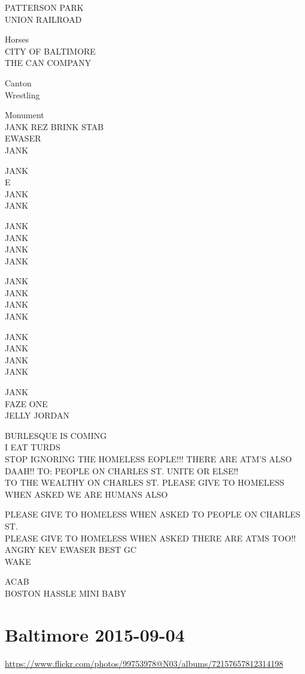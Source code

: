 \documentclass[10pt,letterpaper]{article}
\begin{document}
PATTERSON PARK\\
UNION RAILROAD

Horses\\
CITY OF BALTIMORE\\
THE CAN COMPANY

Canton\\
Wrestling

Monument\\
JANK REZ BRINK STAB\\
EWASER\\
JANK

JANK\\
E\\
JANK\\
JANK

JANK\\
JANK\\
JANK\\
JANK

JANK\\
JANK\\
JANK\\
JANK

JANK\\
JANK\\
JANK\\
JANK

JANK\\
FAZE ONE\\
JELLY JORDAN

BURLESQUE IS COMING\\
I EAT TURDS\\
STOP IGNORING THE HOMELESS EOPLE!!! THERE ARE ATM'S ALSO DAAH!! TO: PEOPLE ON CHARLES ST. UNITE OR ELSE!!\\
TO THE WEALTHY ON CHARLES ST.  PLEASE GIVE TO HOMELESS WHEN ASKED WE ARE HUMANS ALSO

PLEASE GIVE TO HOMELESS WHEN ASKED TO PEOPLE ON CHARLES ST.\\
PLEASE GIVE TO HOMELESS WHEN ASKED THERE ARE ATMS TOO!!\\
ANGRY KEV EWASER BEST GC\\
WAKE

ACAB\\
BOSTON HASSLE MINI BABY


\section*{Baltimore 2015-09-04}

\url{https://www.flickr.com/photos/99753978@N03/albums/72157657812314198}
\end{document}
